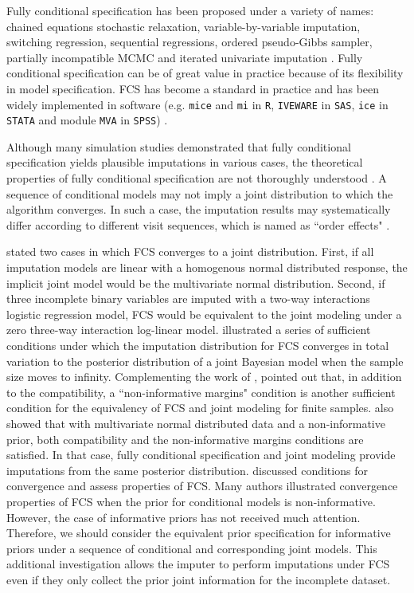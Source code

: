 	Fully conditional specification has been proposed under a variety of names: chained equations stochastic relaxation, variable-by-variable imputation, switching regression, sequential regressions, ordered pseudo-Gibbs sampler, partially incompatible MCMC and iterated univariate imputation \citep[Section 4.5.1]{Buuren2018}. Fully conditional specification can be of great value in practice because of its flexibility in model specification. FCS has become a standard in practice and has been widely implemented in software (e.g. \texttt{mice} and \texttt{mi} in \texttt{R}, \texttt{IVEWARE} in \texttt{SAS}, \texttt{ice} in \texttt{STATA} and module \texttt{MVA} in \texttt{SPSS}) \citep{Buuren2011}.
	
	Although many simulation studies demonstrated that fully conditional specification yields plausible imputations in various cases, the theoretical properties of fully conditional specification are not thoroughly understood \citep{van2007multiple}. A sequence of conditional models may not imply a joint distribution to which the algorithm converges. In such a case, the imputation results may systematically differ according to different visit sequences, which is named as ``order effects" \citep{hughes2014joint}. 
	
	\citet[Section 4.6.1]{Buuren2018} stated two cases in which FCS converges to a joint distribution. First, if all imputation models are linear with a homogenous normal distributed response, the implicit joint model would be the multivariate normal distribution. Second, if three incomplete binary variables are imputed with a two-way interactions logistic regression model, FCS would be equivalent to the joint modeling under a zero three-way interaction log-linear model. \citet{liu2014stationary} illustrated a series of sufficient conditions under which the imputation distribution for FCS converges in total variation to the posterior distribution of a joint Bayesian model when the sample size moves to infinity. Complementing the work of \citet{liu2014stationary}, \citet{hughes2014joint} pointed out that, in addition to the compatibility, a ``non-informative margins" condition is another sufficient condition for the equivalency of FCS and joint modeling for finite samples. \citet{hughes2014joint} also showed that with multivariate normal distributed data and a non-informative prior, both compatibility and the non-informative margins conditions are satisfied. In that case, fully conditional specification and joint modeling provide imputations from the same posterior distribution. \citet{zhu2015convergence} discussed conditions for convergence and assess properties of FCS. Many authors illustrated convergence properties of FCS when the prior for conditional models is non-informative. However, the case of informative priors has not received much attention. Therefore, we should consider the equivalent prior specification for informative priors under a sequence of conditional and corresponding joint models. This additional investigation allows the imputer to perform imputations under FCS even if they only collect the prior joint information for the incomplete dataset.      
	
